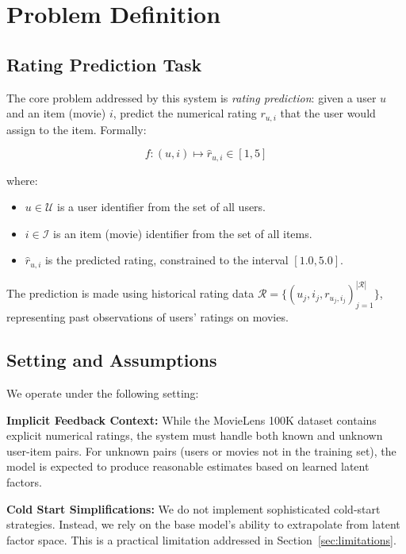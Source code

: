 \section{Problem Definition}
\label{sec:problem}

\subsection{Rating Prediction Task}

The core problem addressed by this system is \textit{rating prediction}: given a user $u$ and an item 
(movie) $i$, predict the numerical rating $r_{u,i}$ that the user would assign to the item. Formally:

\begin{equation}
  f: (u, i) \mapsto \hat{r}_{u,i} \in [1, 5]
\end{equation}

where:
\begin{itemize}
  \item $u \in \mathcal{U}$ is a user identifier from the set of all users.
  \item $i \in \mathcal{I}$ is an item (movie) identifier from the set of all items.
  \item $\hat{r}_{u,i}$ is the predicted rating, constrained to the interval $[1.0, 5.0]$.
\end{itemize}

The prediction is made using historical rating data $\mathcal{R} = \{(u_j, i_j, r_{u_j, i_j})_{j=1}^{|\mathcal{R}|}\}$, 
representing past observations of users' ratings on movies.

\subsection{Setting and Assumptions}

We operate under the following setting:

\textbf{Implicit Feedback Context:} While the MovieLens 100K dataset contains explicit numerical ratings, 
the system must handle both known and unknown user-item pairs. For unknown pairs (users or movies not in the 
training set), the model is expected to produce reasonable estimates based on learned latent factors.

\textbf{Cold Start Simplifications:} We do not implement sophisticated cold-start strategies. Instead, we 
rely on the base model's ability to extrapolate from latent factor space. This is a practical limitation 
addressed in Section~\ref{sec:limitations}.

